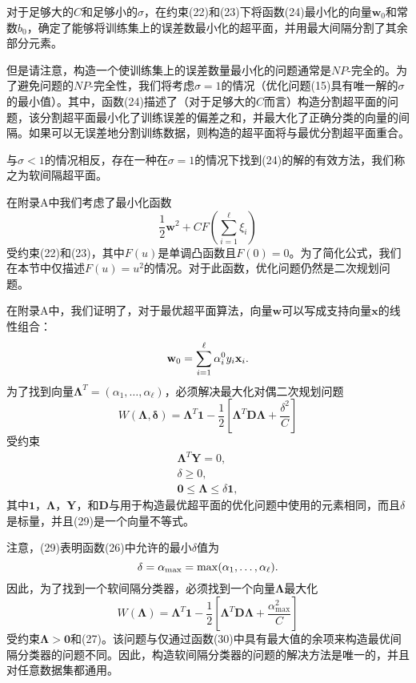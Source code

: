 \documentclass[lang=cn,11pt,a4paper]{elegantpaper}
\begin{document}
	对于足够大的$C$和足够小的$\sigma$，在约束(22)和(23)下将函数(24)最小化的向量$\mathbf{w}_0$和常数$b_0$，确定了能够将训练集上的误差数最小化的超平面，并用最大间隔分割了其余部分元素。

	但是请注意，构造一个使训练集上的误差数量最小化的问题通常是$NP$-完全的。为了避免问题的$NP$-完全性，我们将考虑$\sigma=1$的情况（优化问题(15)具有唯一解的$\sigma$的最小值）。其中，函数(24)描述了（对于足够大的$C$而言）构造分割超平面的问题，该分割超平面最小化了训练误差的偏差之和，并最大化了正确分类的向量的间隔。如果可以无误差地分割训练数据，则构造的超平面将与最优分割超平面重合。

	与$\sigma<1$的情况相反，存在一种在$\sigma=1$的情况下找到(24)的解的有效方法，我们称之为软间隔超平面。

	在附录A中我们考虑了最小化函数
	\begin{equation}
		\frac{1}{2}\mathbf{w}^2+CF\left(\sum_{i=1}^{\ell}\xi_i\right)\tag{25}
	\end{equation}
	受约束(22)和(23)，其中$F(u)$是单调凸函数且$F(0)=0$。为了简化公式，我们在本节中仅描述$F(u)=u^2$的情况。对于此函数，优化问题仍然是二次规划问题。

	在附录A中，我们证明了，对于最优超平面算法，向量$\mathbf{w}$可以写成支持向量$\mathbf{x}$的线性组合：
	\begin{equation}
		\mathbf{w}_0=\sum_{i=1}^{\ell}\alpha_i^0y_i\mathbf{x}_i.\notag
	\end{equation}
	为了找到向量$\mathbf{\Lambda}^T=(\alpha_1,\dots,\alpha_{\ell})$，必须解决最大化对偶二次规划问题
	\begin{equation}
		W(\mathbf{\Lambda,\delta})=\mathbf{\Lambda}^T\mathbf{1}-\frac{1}{2}\left[\mathbf{\Lambda}^T\mathbf{D\Lambda}+\frac{\delta^2}{C}\right]\tag{26}
	\end{equation}
	受约束
	\begin{align}
		\mathbf{\Lambda}^T\mathbf{Y}=0,\tag{27} \\
		\delta\geq0,\tag{28} \\
		\mathbf{0}\leq\mathbf{\Lambda}\leq\delta\mathbf{1},\tag{29}
	\end{align}
	其中$\mathbf{1}$，$\mathbf{\Lambda}$，$\mathbf{Y}$，和$\mathbf{D}$与用于构造最优超平面的优化问题中使用的元素相同，而且$\delta$是标量，并且(29)是一个向量不等式。

	注意，(29)表明函数(26)中允许的最小$\delta$值为
	\begin{equation}
		\delta=\alpha_\mathrm{max}=\max(\alpha_1,\dots,\alpha_{\ell}).\notag
	\end{equation}
	因此，为了找到一个软间隔分类器，必须找到一个向量$\mathbf{\Lambda}$最大化
	\begin{equation}
		W(\mathbf{\Lambda})=\mathbf{\Lambda}^T\mathbf{1}-\frac{1}{2}\left[\mathbf{\Lambda}^T\mathbf{D\Lambda}+\frac{\alpha_{\mathrm{max}}^2}{C}\right]\tag{30}
	\end{equation}
	受约束$\mathbf{\Lambda}>\mathbf{0}$和(27)。该问题与仅通过函数(30)中具有最大值的余项来构造最优间隔分类器的问题不同。因此，构造软间隔分类器的问题的解决方法是唯一的，并且对任意数据集都通用。
\end{document}

